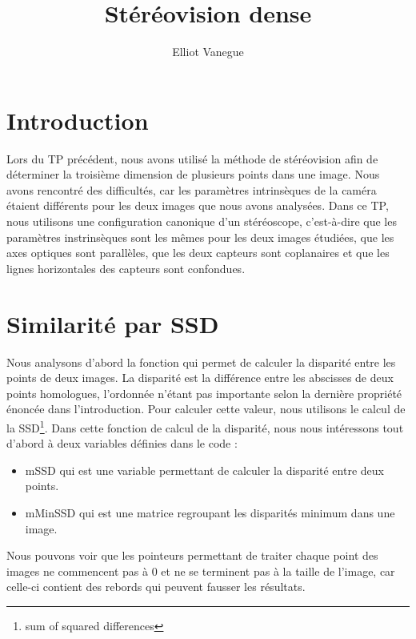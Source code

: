 \documentclass[a4paper,10pt]{article}
\title{Stéréovision dense}
\author{Elliot Vanegue}
\begin{document}
\maketitle

\section{Introduction}
Lors du TP précédent, nous avons utilisé la méthode de stéréovision afin de 
déterminer la troisième dimension de plusieurs points dans une image. Nous 
avons rencontré des difficultés, car les paramètres intrinsèques de la 
caméra étaient différents pour les deux images que nous avons analysées.
Dans ce TP, nous utilisons une configuration canonique d'un stéréoscope,
c'est-à-dire que les paramètres instrinsèques sont les mêmes pour les deux
images étudiées, que les axes optiques sont parallèles, que les deux capteurs
sont coplanaires et que les lignes horizontales des capteurs sont confondues.

\section{Similarité par SSD}
Nous analysons d'abord la fonction qui permet de calculer la disparité entre 
les points de deux images. La disparité est la différence entre les abscisses de
deux points homologues, l'ordonnée n'étant pas importante selon la dernière propriété
énoncée dans l'introduction. Pour calculer cette valeur, nous utilisons le calcul de
la SSD\footnote{sum of squared differences}. Dans cette fonction de calcul de la disparité, 
nous nous intéressons tout d'abord à deux variables définies dans le code :
\begin{itemize}
 \item mSSD qui est une variable permettant de calculer la disparité entre deux points.
 \item mMinSSD qui est une matrice regroupant les disparités minimum dans une image.
\end{itemize}
Nous pouvons voir que les pointeurs permettant de traiter chaque point des images
ne commencent pas à 0 et ne se terminent pas à la taille de l'image, car celle-ci
contient des rebords qui peuvent fausser les résultats.\\
\end{document}
